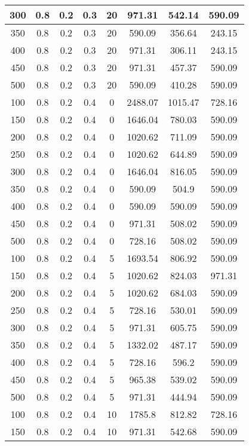\documentclass[a4paper, 12pt]{extreport}
\begin{document}
\begin{itemize}
\begin{longtable}{|c|c|c|c|c|c|c|c|}
			300 & 0.8 & 0.2 & 0.3 & 20 & 971.31 & 542.14 & 590.09 \\\hline
			350 & 0.8 & 0.2 & 0.3 & 20 & 590.09 & 356.64 & 243.15 \\\hline
			400 & 0.8 & 0.2 & 0.3 & 20 & 971.31 & 306.11 & 243.15 \\\hline
			450 & 0.8 & 0.2 & 0.3 & 20 & 971.31 & 457.37 & 590.09 \\\hline
			500 & 0.8 & 0.2 & 0.3 & 20 & 590.09 & 410.28 & 590.09 \\\hline
			100 & 0.8 & 0.2 & 0.4 & 0 & 2488.07 & 1015.47 & 728.16 \\\hline
			150 & 0.8 & 0.2 & 0.4 & 0 & 1646.04 & 780.03 & 590.09 \\\hline
			200 & 0.8 & 0.2 & 0.4 & 0 & 1020.62 & 711.09 & 590.09 \\\hline
			250 & 0.8 & 0.2 & 0.4 & 0 & 1020.62 & 644.89 & 590.09 \\\hline
			300 & 0.8 & 0.2 & 0.4 & 0 & 1646.04 & 816.05 & 590.09 \\\hline
			350 & 0.8 & 0.2 & 0.4 & 0 & 590.09 & 504.9 & 590.09 \\\hline
			400 & 0.8 & 0.2 & 0.4 & 0 & 590.09 & 590.09 & 590.09 \\\hline
			450 & 0.8 & 0.2 & 0.4 & 0 & 971.31 & 508.02 & 590.09 \\\hline
			500 & 0.8 & 0.2 & 0.4 & 0 & 728.16 & 508.02 & 590.09 \\\hline
			100 & 0.8 & 0.2 & 0.4 & 5 & 1693.54 & 806.92 & 590.09 \\\hline
			150 & 0.8 & 0.2 & 0.4 & 5 & 1020.62 & 824.03 & 971.31 \\\hline
			200 & 0.8 & 0.2 & 0.4 & 5 & 1020.62 & 684.03 & 590.09 \\\hline
			250 & 0.8 & 0.2 & 0.4 & 5 & 728.16 & 530.01 & 590.09 \\\hline
			300 & 0.8 & 0.2 & 0.4 & 5 & 971.31 & 605.75 & 590.09 \\\hline
			350 & 0.8 & 0.2 & 0.4 & 5 & 1332.02 & 487.17 & 590.09 \\\hline
			400 & 0.8 & 0.2 & 0.4 & 5 & 728.16 & 596.2 & 590.09 \\\hline
			450 & 0.8 & 0.2 & 0.4 & 5 & 965.38 & 539.02 & 590.09 \\\hline
			500 & 0.8 & 0.2 & 0.4 & 5 & 971.31 & 444.94 & 590.09 \\\hline
			100 & 0.8 & 0.2 & 0.4 & 10 & 1785.8 & 812.82 & 728.16 \\\hline
			150 & 0.8 & 0.2 & 0.4 & 10 & 971.31 & 542.68 & 590.09 \\\hline

\end{longtable}
\end{itemize}
\end{document}
